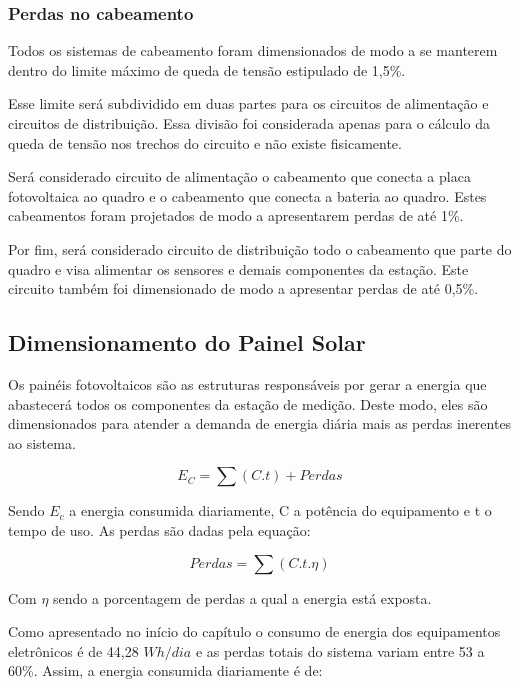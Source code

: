\subsubsection{Perdas no cabeamento}

	Todos os sistemas de cabeamento foram dimensionados de modo a se manterem dentro do limite máximo de queda de tensão estipulado de 1,5\%.
	
	Esse limite será subdividido em duas partes para os circuitos de alimentação e circuitos de distribuição. Essa divisão foi considerada apenas para o cálculo da queda de tensão nos trechos do circuito e não existe fisicamente.
	 
	Será considerado circuito de alimentação o cabeamento que conecta a placa fotovoltaica ao quadro e o cabeamento que conecta a bateria ao quadro. Estes cabeamentos foram projetados de modo a apresentarem perdas de até 1\%.
	
	Por fim, será considerado circuito de distribuição todo o cabeamento que parte do quadro e visa alimentar os sensores e demais componentes da estação. Este circuito também foi dimensionado de modo a apresentar perdas de até 0,5\%.

\subsection{Dimensionamento do Painel Solar}

Os painéis fotovoltaicos são as estruturas responsáveis por gerar a energia que abastecerá todos os componentes da estação de medição. Deste modo, eles são dimensionados para atender a demanda de energia diária mais as perdas inerentes ao sistema.

\begin{equation}
	E_C = \sum(C.t) + Perdas
\end{equation}

	Sendo $E_c$ a energia consumida diariamente, C a potência do equipamento e t o tempo de uso. As perdas são dadas pela equação:
	
\begin{equation}
	Perdas = \sum (C . t . \eta)
\end{equation}	
	
	Com $\eta$ sendo a porcentagem de perdas a qual a energia está exposta.
	
	Como apresentado no início do capítulo o consumo de energia dos equipamentos eletrônicos é de 44,28 $Wh/dia$ e as perdas totais do sistema variam entre 53 a 60\%. Assim, a energia consumida diariamente é de:

